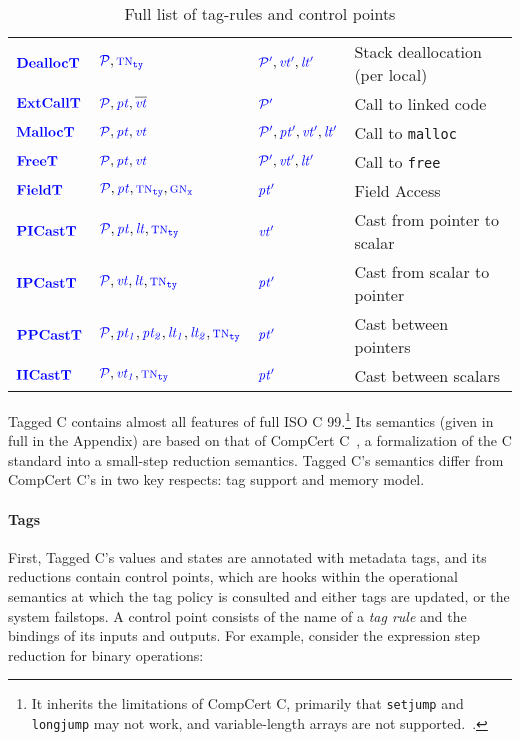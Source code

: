 \documentclass{llncs}
\begin{document}
\begin{table}[t]
\begin{tabular}{|l|l|l|l|}
    \(\dealloctname\)   & \(\dealloctargs\)      & \(\dealloctres\)   & Stack deallocation (per local) \\
    \(\extcalltname\)   & \(\extcalltargs\)      & \(\extcalltres\)   & Call to linked code \\
    \(\malloctname\)    & \(\malloctargs\)       & \(\malloctres\)    & Call to {\tt malloc} \\
    \(\freetname\)      & \(\freetargs\)         & \(\freetres\)      & Call to {\tt free} \\
    \(\fieldtname\)     & \(\fieldtargs\)        & \(\fieldtres\)     & Field Access \\
    \(\picasttname\)    & \(\picasttargs\)       & \(\picasttres\)    & Cast from pointer to scalar \\
    \(\ipcasttname\)    & \(\ipcasttargs\)       & \(\ipcasttres\)    & Cast from scalar to pointer \\
    \(\ppcasttname\)    & \(\ppcasttargs\)       & \(\ppcasttres\)    & Cast between pointers \\
    \(\iicasttname\)    & \(\iicasttargs\)       & \(\iicasttres\)    & Cast between scalars \\
    \hline
  \end{tabular}

  \caption{Full list of tag-rules and control points}
  \label{fig:controlpoints}
\end{table}

Tagged C contains almost all features of full ISO C 99.\footnote{
It inherits the limitations of CompCert C, primarily that {\tt setjump} and {\tt longjump}
may not work, and variable-length arrays are not supported.~\cite[Ch. 5]{Leroy22:CompCertManual}.}
Its semantics (given in full in the Appendix)
are based on that of CompCert C~\cite{Leroy09:CompCert},
a formalization of the C standard into a small-step reduction semantics.
Tagged C's semantics differ from CompCert C's in two key respects: tag support and memory model.

\paragraph*{Tags} First, Tagged C's values
and states are annotated with metadata tags, and its reductions contain
control points, which are hooks within the
operational semantics at which the tag policy is consulted and either tags are updated, or the system
failstops. A control point consists of the name of a {\em tag rule}
and the bindings of its inputs and outputs. For example, consider the expression step reduction
for binary operations:
\end{document}
